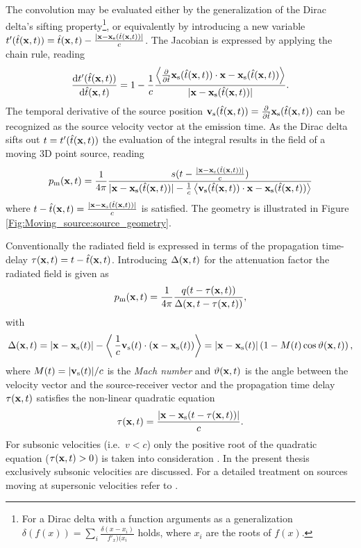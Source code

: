 The convolution may be evaluated either by the generalization of the Dirac delta's sifting property\footnote{
For a Dirac delta with a function arguments as a generalization $\delta(f(x)) = \sum_{i}\frac{\delta(x-x_i)}{f'_{x})(x_i}$ holds, where $x_i$ are the roots of $f(x)$.}, 
or equivalently by introducing a new variable $t'(\hat{t}(\mathbf{x},t)) = \hat{t}(\mathbf{x},t) - \frac{|\mathbf{x}-\mathbf{x}_{\mathrm{s}}(\hat{t}(\mathbf{x},t))|}{c}$.
The Jacobian is expressed by applying the chain rule, reading 
\begin{equation}
\frac{\mathrm{d} t'(\hat{t}(\mathbf{x},t))}{\mathrm{d} \hat{t}(\mathbf{x},t)} = 1 - \frac{1}{c} \frac{\left< \frac{\partial}{\partial \hat{t}}\mathbf{x}_{\mathrm{s}}(\hat{t}(\mathbf{x},t)) \cdot \mathbf{x}-\mathbf{x}_{\mathrm{s}}(\hat{t}(\mathbf{x},t))\right> }{|\mathbf{x}-\mathbf{x}_{\mathrm{s}}(\hat{t}(\mathbf{x},t))|}.
\end{equation}
The temporal derivative of the source position $\mathbf{v}_{\mathrm{s}}(\hat{t}(\mathbf{x},t)) = \frac{\partial}{\partial \hat{t}}\mathbf{x}_{\mathrm{s}}(\hat{t}(\mathbf{x},t))$ can be recognized as the source velocity vector at the emission time.
As the Dirac delta sifts out $t = t'(\hat{t}(\mathbf{x},t))$ the evaluation of the integral results in the field of a moving 3D point source, reading
\begin{equation}
p_{\mathrm{m}}(\mathbf{x},t) =
\frac{1}{4\pi} \frac{ s(t - \frac{|\mathbf{x}-\mathbf{x}_{\mathrm{s}}(\hat{t}(\mathbf{x},t))|}{c} ) }{|\mathbf{x}-\mathbf{x}_{\mathrm{s}}(\hat{t}(\mathbf{x},t))| - \frac{1}{c}\left< \mathbf{v}_{\mathrm{s}}(\hat{t}(\mathbf{x},t)) \cdot \mathbf{x}-\mathbf{x}_{\mathrm{s}}(\hat{t}(\mathbf{x},t))\right> }
\end{equation}
where $t - \hat{t}(\mathbf{x},t) = \frac{|\mathbf{x}-\mathbf{x}_{\mathrm{s}}(\hat{t}(\mathbf{x},t))|}{c}$ is satisfied.
The geometry is illustrated in Figure \ref{Fig:Moving_source:source_geometry}.

Conventionally the radiated field is expressed in terms of the propagation time-delay $\tau(\mathbf{x},t) = t - \hat{t}(\mathbf{x},t)$.
Introducing $\Delta(\mathbf{x},t)$ for the attenuation factor the radiated field is given as
\begin{equation}
p_{\mathrm{m}}(\mathbf{x},t) = \frac{1}{4\pi}\frac{q( t - \tau( \mathbf{x},t ) )}{\Delta(\mathbf{x},t-\tau( \mathbf{x}, t ))},
\label{eq:moving_source_field}
\end{equation}
with
\begin{equation}
\Delta( \mathbf{x},t ) = |\mathbf{x} - \mathbf{x}_{\mathrm{s}}(t)| - \left<\, \frac{1}{c}\mathbf{v}_{\mathrm{s}}(t) \cdot (\mathbf{x} - \mathbf{x}_{\mathrm{s}}(t)) \right> 
 =  |\mathbf{x} - \mathbf{x}_{\mathrm{s}}(t)|\left( 1 - M(t) \cos \vartheta(\mathbf{x},t) \right),
\label{eq:delta}
\end{equation}
where $M(t) = |\mathbf{v}_{\mathrm{s}}(t)|/c$ is the \emph{Mach number} and $\vartheta(\mathbf{x},t)$ is the angle between the velocity vector and the source-receiver vector and the propagation time delay $\tau(\mathbf{x},t)$ satisfies the non-linear quadratic equation
%
\begin{equation}
\tau(\mathbf{x},t) =  \frac{| \mathbf{x} - \mathbf{x}_{\mathrm{s}}( t - \tau(\mathbf{x},t)) |  }{c}.
\label{eq:tau}
\end{equation}
%
For subsonic velocities (i.e.\ $v<c$) only the positive root of the quadratic equation ($\tau(\mathbf{x},t)>0$) is taken into consideration \citep{deHoop2005}. 
In the present thesis exclusively subsonic velocities are discussed.
For a detailed treatment on sources moving at supersonic velocities refer to \cite{Ahrens2012, Ahrens2008moving_b}.

